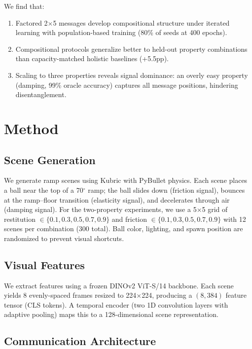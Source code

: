 \documentclass[11pt,a4paper]{article}
\begin{document}
We find that:
\begin{enumerate}
    \item Factored 2$\times$5 messages develop compositional structure under iterated learning with population-based training (80\% of seeds at 400 epochs).
    \item Compositional protocols generalize better to held-out property combinations than capacity-matched holistic baselines (+5.5pp).
    \item Scaling to three properties reveals signal dominance: an overly easy property (damping, 99\% oracle accuracy) captures all message positions, hindering disentanglement.
\end{enumerate}

\section{Method}
\label{sec:method}

\subsection{Scene Generation}

We generate ramp scenes using Kubric with PyBullet physics.
Each scene places a ball near the top of a 70$^\circ$ ramp; the ball slides down (friction signal), bounces at the ramp--floor transition (elasticity signal), and decelerates through air (damping signal).
For the two-property experiments, we use a 5$\times$5 grid of restitution $\in \{0.1, 0.3, 0.5, 0.7, 0.9\}$ and friction $\in \{0.1, 0.3, 0.5, 0.7, 0.9\}$ with 12 scenes per combination (300 total).
Ball color, lighting, and spawn position are randomized to prevent visual shortcuts.

\subsection{Visual Features}

We extract features using a frozen DINOv2 ViT-S/14 backbone.
Each scene yields 8 evenly-spaced frames resized to 224$\times$224, producing a $(8, 384)$ feature tensor (CLS tokens).
A temporal encoder (two 1D convolution layers with adaptive pooling) maps this to a 128-dimensional scene representation.

\subsection{Communication Architecture}
\end{document}
